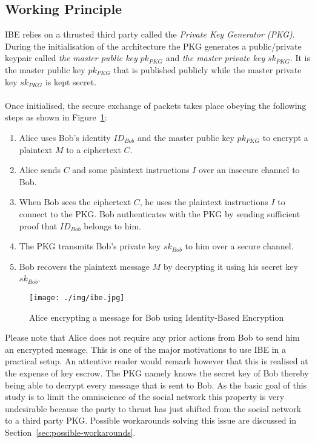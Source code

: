 \documentclass[journal]{IEEEtran}
\begin{document}
\subsection{Working Principle~\cite{YoungbloodIntroduction}}
IBE relies on a thrusted third party called the \textit{Private Key Generator
(PKG)}. During the initialisation of the architecture the PKG generates a
public/private keypair called \textit{the master public key} $pk_{PKG}$ and
\textit{the master private key} $sk_{PKG}$. It is the master public key
$pk_{PKG}$ that is published publicly while the master private key $sk_{PKG}$
is kept secret.\\
\\
Once initialised, the secure exchange of packets takes place obeying the
following steps as shown in Figure~\ref{fig:ibe}:

\begin{enumerate}
 \item Alice uses Bob's identity $ID_{Bob}$ and the master public key $pk_{PKG}$
to encrypt a plaintext $M$ to a ciphertext $C$.
 \item Alice sends $C$ and some plaintext instructions $I$ over an insecure
channel to Bob.
 \item When Bob sees the ciphertext $C$, he uses the plaintext instructions $I$
to connect to the PKG. Bob authenticates with the PKG by sending sufficient
proof that $ID_{Bob}$ belongs to him.
 \item The PKG transmits Bob's private key $sk_{Bob}$ to him over a secure
channel.
 \item Bob recovers the plaintext message $M$ by decrypting it using his secret
key $sk_{Bob}$.
\end{enumerate}


\begin{figure}[H]
  \centering
  \texttt{[image: ./img/ibe.jpg]}
  \caption{Alice encrypting a message for Bob using Identity-Based Encryption}
  \label{fig:ibe}
\end{figure}

Please note that Alice does not require any prior actions from Bob to send him
an encrypted message. This is one of the major motivations to use IBE in a
practical setup. An attentive reader would remark however that this is realised
at the expense of key escrow. The PKG namely knows the secret key of Bob thereby
being able to decrypt every message that is sent to Bob. As the basic goal of
this study is to limit the omniscience of the social network this property is
very undesirable because the party to thrust has just shifted from the social
network to a third party PKG. Possible workarounds solving this issue are
discussed in Section~\ref{sec:possible-workarounds}.
\end{document}
